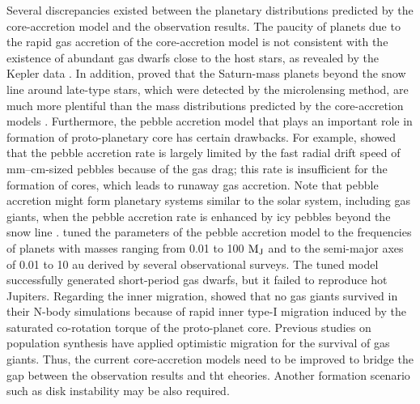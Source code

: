 \documentclass[twocolumn]{aastex62}
\begin{document}
\begin{CJK*}{UTF8}{min}
Several discrepancies existed between the planetary distributions predicted by the core-accretion model and the observation results. The paucity of planets due to the rapid gas accretion of the core-accretion model \citep{2004ApJ...604..388I, 2014A&A...567A.121D} is not consistent with the existence of abundant gas dwarfs close to the host stars, as revealed by the Kepler data \citep[e.g.,][]{2018ApJS..235...38T}. In addition, \cite{2018ApJ...869L..34S} proved that the Saturn-mass planets beyond the snow line around late-type stars, which were detected by the microlensing method, are much more plentiful than the mass distributions predicted by the core-accretion models \citep{2004ApJ...604..388I, 2009A&A...501.1161M}. Furthermore, the pebble accretion model that plays an important role in formation of proto-planetary core \citep{2010A&A...520A..43O, 2012A&A...544A..32L} has certain drawbacks. For example, \cite{2018MNRAS.480.4338L} showed that the pebble accretion rate is largely limited by the fast radial drift speed of mm--cm-sized pebbles because of the gas drag; this rate is insufficient for the formation of cores, which leads to runaway gas accretion. Note that pebble accretion might form planetary systems similar to the solar system, including gas giants, when the pebble accretion rate is enhanced by icy pebbles beyond the snow line \citep{2016ApJ...825...63C}. \cite{2018ApJ...865...30C} tuned the parameters of the pebble accretion model to the frequencies of planets with masses ranging from 0.01 to 100 $\rm M_J$ and to the semi-major axes of 0.01 to 10 au derived by several observational surveys. The tuned model successfully generated short-period gas dwarfs, but it failed to reproduce hot Jupiters. Regarding the inner migration, \cite{2014MNRAS.445..479C} showed that no gas giants survived in their N-body simulations because of rapid inner type-I migration induced by the saturated co-rotation torque of the proto-planet core. Previous studies on population synthesis have applied optimistic migration for the survival of gas giants. Thus, the current core-accretion models need to be improved to bridge the gap between the observation results and tht eheories. Another formation scenario such as disk instability may be also required.


\end{CJK*}
\end{document}
